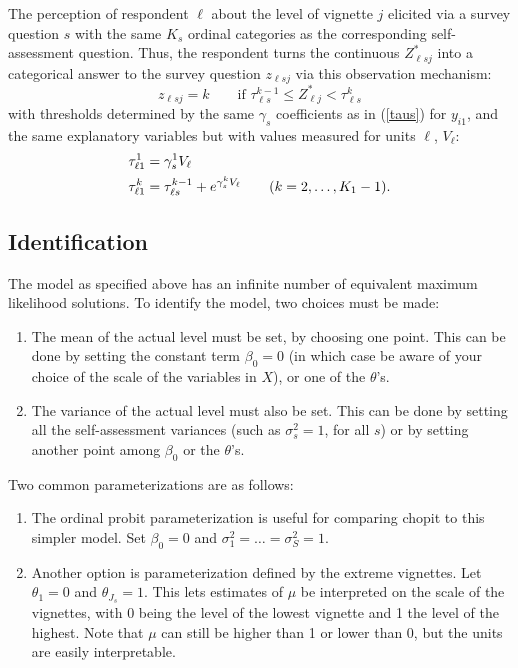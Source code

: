 \documentclass{amsart}
\begin{document}
The perception of respondent ${\ell}$ about the level of vignette $j$
elicited via a survey question $s$ with the same $K_s$ ordinal
categories as the corresponding self-assessment question.  Thus, the
respondent turns the continuous $Z_{{\ell}sj}^*$ into a categorical
answer to the survey question $z_{{\ell}sj}$ via this observation
mechanism:
\begin{equation}
  \label{obsmech-v}
  z_{{\ell}sj} = k \qquad \text{if $\tau_{\ell s}^{k-1}\leq Z_{{\ell}j}^* 
    < \tau_{\ell s}^k$}
\end{equation}
with thresholds determined by the same $\gamma_s$ coefficients as in
(\ref{taus}) for $y_{i1}$, and the same explanatory variables but with
values measured for units $\ell$, $V_{\ell}$:
\begin{align}
  \label{taus-v}
  \tau_{{\ell}1}^1 &= \gamma_s^1 V_{\ell} \\ \notag \tau_{{\ell}1}^k
  &= \tau^{k-1}_{{\ell}s} +e^{\gamma_s^k V_{\ell}}\qquad
  (k=2,\dots,K_1-1).
\end{align}

\subsection{Identification}

The model as specified above has an infinite number of equivalent
maximum likelihood solutions.  To identify the model, two choices must
be made:
\begin{enumerate}
\item The mean of the actual level must be set, by choosing one point.
  This can be done by setting the constant term $\beta_0=0$ (in which
  case be aware of your choice of the scale of the variables in $X$),
  or one of the $\theta$'s.
\item The variance of the actual level must also be set.  This can be
  done by setting all the self-assessment variances (such as
  $\sigma^2_s=1$, for all $s$) or by setting another point among
  $\beta_0$ or the $\theta$'s.
\end{enumerate}
Two common parameterizations are as follows:
\begin{enumerate}
\item The ordinal probit parameterization is useful for comparing
  chopit to this simpler model.  Set $\beta_0=0$ and
  $\sigma^2_1=\dots=\sigma^2_S=1$.
\item Another option is parameterization defined by the extreme
  vignettes.  Let $\theta_1=0$ and $\theta_{J_s}=1$.  This lets
  estimates of $\mu$ be interpreted on the scale of the vignettes,
  with 0 being the level of the lowest vignette and 1 the level of the
  highest.  Note that $\mu$ can still be higher than 1 or lower than 0,
  but the units are easily interpretable.
\end{enumerate}
\end{document}
